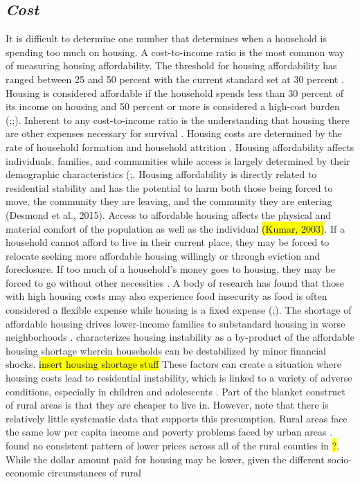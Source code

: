 \subsection{\textit{Cost}}
It is difficult to determine one number that determines when a household is spending too much on housing. A cost-to-income ratio is the most common way of measuring housing affordability. The threshold for housing affordability has ranged between 25 and 50 percent with the current standard set at 30 percent \citep{kropczynski_insights_2012}.  Housing is considered affordable if the household spends less than 30 percent of its income on housing and 50 percent or more is considered a high-cost burden (\citealp{braveman_housing_2011};\citealp{swope_housing_2020};\citealp{weicher_housing_2006}). Inherent to any cost-to-income ratio is the understanding that housing there are other expenses necessary for survival \citep{herbert_measuring_2018}. Housing costs are determined by the rate of household formation and household attrition \citep{pendall_future_2016}.  Housing affordability affects individuals, families, and communities while access is largely determined by their demographic characteristics  (\citealp{braveman_housing_2011};\citealp{yadavalli_comprehensive_2020}. Housing affordability is directly related to residential stability and has the potential to harm both those being forced to move, the community they are leaving, and the community they are entering (Desmond et al., 2015). Access to affordable housing affects the physical and material comfort of the population as well as the individual \hl{(Kumar, 2003)}. If a household cannot afford to live in their current place, they may be forced to relocate seeking more affordable housing willingly or through eviction and foreclosure.  If too much of a household’s money goes to housing, they may be forced to go without other necessities \citep{herbert_measuring_2018}. A body of research has found that those with high housing costs may also experience food insecurity as food is often considered a flexible expense while housing is a fixed expense (\citealp{fletcher_assessing_2009};\citealp{kropczynski_insights_2012}). The shortage of affordable housing drives lower-income families to substandard housing in worse neighborhoods \citep{braveman_housing_2011}. \citet{kang_severe_2021} characterizes housing instability as a by-product of the affordable housing shortage wherein households can be destabilized by minor financial shocks. \hl{insert housing shortage stuff} These factors can create a situation where housing costs lead to residential instability, which is linked to a variety of adverse conditions, especially in children and adolescents \citep{desmond_forced_2015}. Part of the blanket construct of rural areas is that they are cheaper to live in. However, \citep{kurre_is_2003} note that there is relatively little systematic data that supports this presumption. Rural areas face the same low per capita income and poverty problems faced by urban areas \citep{castle_place_2011}. \citep{zimmerman_does_2008} found no consistent pattern of lower prices across all of the rural counties in \hl{?}. While the dollar amount paid for housing may be lower, given the different socio-economic circumstances of rural 
